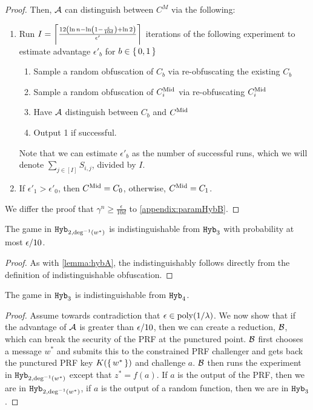 \begin{lemma}
\begin{proof}
		Then, $\mathcal{A}$ can distinguish between $C^M$ via the following:
		\begin{enumerate}
			\item Run $I =\left\lceil \frac{12\left(\ln n - \ln\left(1 - \frac{\epsilon}{10d}\right) + \ln 2\right)}{\epsilon'} \right\rceil$ iterations of the following experiment to estimate advantage $\epsilon'_b$ for $b \in \set{0, 1}$
				\begin{enumerate}
					\item Sample a random obfuscation of $C_b$ via re-obfuscating the existing $C_b$
					\item Sample a random obfuscation of $C^{\text{Mid}}_i$ via re-obfuscating $C^{\text{Mid}}_i$
					\item Have $\mathcal{A}$ distinguish between $C_b$ and $C^{\text{Mid}}$
					\item Output 1 if successful.
				\end{enumerate}
			Note that we can estimate $\epsilon'_b$ as the number of successful runs, which we will denote $\sum_{j \in [I]} S_{i, j}$, divided by $I$.
			\item If $\epsilon'_1 > \epsilon'_0$, then $C^{\text{Mid}} = C_0$, otherwise, $C^{\text{Mid}} = C_1$.
		\end{enumerate}

		We differ the proof that $\gamma^n \geq \frac{\epsilon}{10d}$ to \cref{appendix:paramHybB}.
	\end{proof}
	
\end{lemma}

\begin{lemma}
	The game in $\texttt{Hyb}_{2, \deg^{-1}(w^*)}$ is indistinguishable from $\texttt{Hyb}_3$ with probability
	at most $\epsilon/10$.
	\begin{proof}
		As with \cref{lemma:hybA}, 
		the indistinguishably follows directly from the definition of indistinguishable obfuscation.
	\end{proof}
\end{lemma}

\begin{lemma}
	\label{lemma:hybC}
	The game in $\texttt{Hyb}_{3}$ is indistinguishable from $\texttt{Hyb}_4$.
	\begin{proof}
		Assume towards contradiction that $\epsilon \in \operatorname{poly}(1/\lambda)$.
		We now show that if the advantage of $\mathcal{A}$ is greater than $\epsilon/10$, then we can
		create a reduction, $\mathcal{B}$, which can break the security of the PRF at the punctured point.
		$\mathcal{B}$ first chooses a message $w^*$ and submits this to the constrained PRF challenger and gets back the punctured PRF key
		$K(\set{w^*})$ and challenge $a$. $\mathcal{B}$ then runs the experiment in $\texttt{Hyb}_{2, \deg^{-1}(w^*)}$
		except that $z^* = f(a)$. If $a$ is the output of the PRF, then we are in $\texttt{Hyb}_{2, \deg^{-1}(w^*)}$,
		if $a$ is the output of a random function, then we are in $\texttt{Hyb}_3$.
	\end{proof}
\end{lemma}

